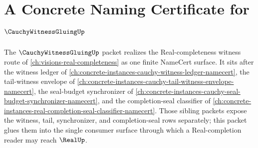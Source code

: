 \chapter{A Concrete Naming Certificate for $\CauchyWitnessGluingUp$}
\label{ch:concrete-instances-cauchy-witness-gluing-namecert}

The $\CauchyWitnessGluingUp$ packet realizes the Real-completeness witness route of \autoref{ch:visions-real-completeness} as one finite NameCert surface. It sits after the witness ledger of \autoref{ch:concrete-instances-cauchy-witness-ledger-namecert}, the tail-witness envelope of \autoref{ch:concrete-instances-cauchy-tail-witness-envelope-namecert}, the seal-budget synchronizer of \autoref{ch:concrete-instances-cauchy-seal-budget-synchronizer-namecert}, and the completion-seal classifier of \autoref{ch:concrete-instances-real-completion-seal-classifier-namecert}. Those sibling packets expose the witness, tail, synchronizer, and completion-seal rows separately; this packet glues them into the single consumer surface through which a Real-completion reader may reach $\RealUp$.

